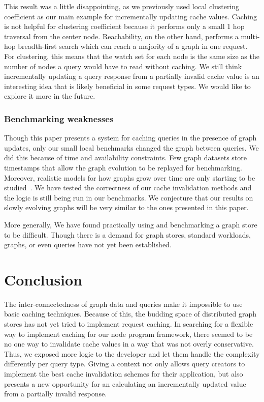 \documentclass[letterpaper,twocolumn,11pt,tight]{article}
\begin{document}
This result was a little disappointing, as we previously used local clustering coefficient as our main example for incrementally updating cache values. Caching is not helpful for clustering coefficient because it performs only a small 1 hop traversal from the center node. Reachability,  on the other hand, performs a multi-hop breadth-first search which can reach a majority of a graph in one request. For clustering, this means that the watch set for each node is the same size as the number of nodes a query would have to read without caching.
We still think incrementally updating a query response from a partially invalid cache value is an interesting idea that is likely beneficial in some request types. We would like to explore it more in the future.

\subsubsection{Benchmarking weaknesses}
Though this paper presents a system for caching queries in the presence of graph updates, only our small local benchmarks changed the graph between queries. We did this because of time and availability constraints.
Few graph datasets store timestamps that allow the graph evolution to be replayed for benchmarking.
Moreover, realistic models for how graphs grow over time are only starting to be studied~\cite{graph_evolve}.
We have tested the correctness of our cache invalidation methods and the logic is still being run in our benchmarks. We conjecture that our results on slowly evolving graphs will be very similar to the ones presented in this paper.

More generally, We have found practically using and benchmarking a graph store to be difficult. Though there is a demand for graph stores, standard workloads, graphs, or even queries have not yet been established. %
\section{Conclusion}\label{sec:conclusion}
The inter-connectedness of graph data and queries make it impossible to use basic caching techniques. Because of this, the budding space of distributed graph stores has not yet tried to implement request caching.
In searching for a flexible way to implement caching for our node program framework, there seemed to be no one way to invalidate cache values in a way that was not overly conservative.
Thus, we exposed more logic to the developer and let them handle the complexity differently per query type. Giving a context not only allows query creators to implement the best cache invalidation schemes for their application, but also presents a new opportunity for an calculating an incrementally updated value from a partially invalid response.
\end{document}

